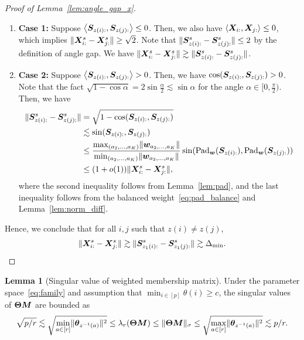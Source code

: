 \documentclass[lettersize,onecolumn,journal]{IEEEtran}
\theoremstyle{definition}
\newtheorem{lem}{Lemma}
\theoremstyle{definition}
\newcommand{\ang}[1]{\left\langle#1\right\rangle}
\begin{document}
\begin{proof}[Proof of Lemma~\ref{lem:angle_gap_x}]
\begin{enumerate}[wide]
    \item \textbf{Case 1:} Suppose $\ang{\mS_{z(i):}, \mS_{z(j):}} \leq 0$. Then, we also have $\ang{\mX_{i:},\mX_{j:}} \leq 0$, which implies $\lVert\bm X_{i:}^s -  \bm X_{j:}^s\rVert \geq \sqrt{2}$. Note that $\lVert\bm S_{z(i):}^s - \bm S_{z(j):}^s\rVert \leq 2$ by the definition of angle gap. We have $\lVert\bm X_{i:}^s -  \bm X_{j:}^s\rVert \gtrsim \lVert\bm S_{z(i):}^s - \bm S_{z(j):}^s\rVert$.
    \item \textbf{Case 2:} Suppose $\ang{\mS_{z(i):}, \mS_{z(j):}} > 0$. Then, we have $\cos(\bm S_{z(i):}, \bm S_{z(j):}) > 0$. Note that the fact $\sqrt{1 - \cos \alpha} = 2 \sin \frac{\alpha}{2} \lesssim \sin \alpha$ for the angle $\alpha \in [0, \frac{\pi}{2})$. Then, we have 
    \begin{align}
        \lVert\bm S_{z(i):}^s - \bm S_{z(j):}^s\rVert &= \sqrt{ 1 - \cos(\bm S_{z(i):}, \bm S_{z(j):})}  \\
        & \lesssim \sin (\bm S_{z(i):}, \bm S_{z(j):})\\
        & \leq \frac{ \max_{(a_2,\ldots, a_K)} \lVert\bm{w}_{a_2,\ldots, a_K}\rVert }{  \min_{(a_2,\ldots, a_K)} \lVert\bm{w}_{a_2,\ldots, a_K}\rVert }  \sin ( \text{Pad}_{\bm{w}} (\bm S_{z(i):}), \text{Pad}_{\bm{w}}(\bm S_{z(j):})) \\
        & \leq (1 + o(1)) \lVert\bm X_{i:}^s -  \bm X_{j:}^s\rVert,
    \end{align}
    where the second inequality follows from Lemma~\ref{lem:pad}, and the last inequality follows from the balanced weight~\eqref{eq:pad_balance} and Lemma~\ref{lem:norm_diff}.
\end{enumerate}

Hence, we conclude that for all $i,j$ such that $z(i) \neq z(j)$,
\begin{equation}
    \lVert\bm X_{i:}^s - \bm X_{j:}^s\rVert \gtrsim  \lVert\bm S_{z_1(i):}^s - \bm S_{z_1(j):}^s\rVert \gtrsim  \Delta_{\min}.
\end{equation}
\end{proof}

\begin{lem}[Singular value of weighted membership matrix]\label{lem:singular_thetam} Under the parameter space~\eqref{eq:family} and assumption that $\min_{i \in [p]} \theta(i) \geq c$, the singular values of $\boldsymbol{\Theta} \bm M$ are bounded as 
\begin{equation}\label{eq:membership2}
     \sqrt{p/r} \lesssim \sqrt{ \min_{a \in [r]}\onormSize{}{ \mtheta_{ z^{-1}(a)} }^2 }  \leq \lambda_{r}(\mTheta \mM) \leq \onormSize{}{\mTheta \mM}_{\sigma} \leq\sqrt{ \max_{a \in [r]}\onormSize{}{ \mtheta_{ z^{-1}(a)} }^2 } \lesssim  p /r .
\end{equation}
\end{lem}
\end{document}

